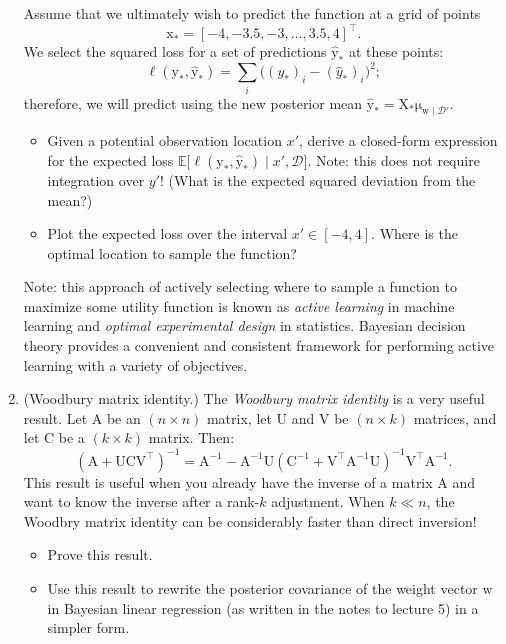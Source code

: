 \documentclass{article}
\newcommand{\given}{\mid}
\newcommand{\mc}[1]{\mathcal{#1}}
\newcommand{\data}{\mc{D}}
\newcommand{\mat}[1]{\bm{\mathrm{#1}}}
\renewcommand{\vec}[1]{\bm{\mathrm{#1}}}
\newcommand{\trans}{^\top}
\newcommand{\inv}{^{-1}}
\begin{document}
\begin{enumerate}
  Assume that we ultimately wish to predict the function at a grid of
  points
  \begin{equation*}
    \vec{x}_\ast = [-4, -3.5, -3, \dotsc, 3.5, 4]\trans.
  \end{equation*}
  We select the squared loss for a set of predictions
  $\hat{\vec{y}}_\ast$ at these points:
  \begin{equation*}
    \ell(\vec{y}_\ast, \hat{\vec{y}}_\ast)
    =
    \sum_i \bigl((y_\ast)_i - (\hat{y}_\ast)_i\bigr)^2;
  \end{equation*}
  therefore, we will predict using the new posterior mean
  $\hat{\vec{y}}_\ast = \mat{X}_\ast \vec{\mu}_{\vec{w}\given\data'}$.
  \begin{itemize}
  \item
    Given a potential observation location $x'$, derive a closed-form
    expression for the expected loss
    $\mathbb{E}\bigl[\ell(\vec{y}_\ast, \hat{\vec{y}}_\ast) \given x',
      \data \bigr]$.  Note: this does not require integration over
    $y'$!  (What is the expected squared deviation from the mean?)
  \item
    Plot the expected loss over the interval $x' \in [-4, 4]$.  Where
    is the optimal location to sample the function?
  \end{itemize}

  Note: this approach of actively selecting where to sample a function
  to maximize some utility function is known as \emph{active learning}
  in machine learning and \emph{optimal experimental design} in
  statistics.  Bayesian decision theory provides a convenient and
  consistent framework for performing active learning with a variety
  of objectives.

\item
  (Woodbury matrix identity.)
  The \emph{Woodbury matrix identity} is a very useful result.  Let
  $\mat{A}$ be an $(n \times n)$ matrix, let $\mat{U}$ and $\mat{V}$
  be $(n \times k)$ matrices, and let $\mat{C}$ be a $(k \times k)$
  matrix.  Then:
  \begin{equation*}
    (\mat{A} + \mat{U}\mat{C}\mat{V}\trans)\inv
    =
    \mat{A}\inv
    -
    \mat{A}\inv
    \mat{U}
    (\mat{C}\inv + \mat{V}\trans \mat{A}\inv \mat{U})\inv
    \mat{V}\trans
    \mat{A}\inv.
  \end{equation*}
  This result is useful when you already have the inverse of a matrix
  $\mat{A}$ and want to know the inverse after a rank-$k$ adjustment.
  When $k \ll n$, the Woodbry matrix identity can be considerably
  faster than direct inversion!
  \begin{itemize}
  \item
    Prove this result.
  \item
    Use this result to rewrite the posterior covariance of the weight
    vector $\vec{w}$ in Bayesian linear regression (as written in the
    notes to lecture 5) in a simpler form.
  \end{itemize}


\end{enumerate}
\end{document}
